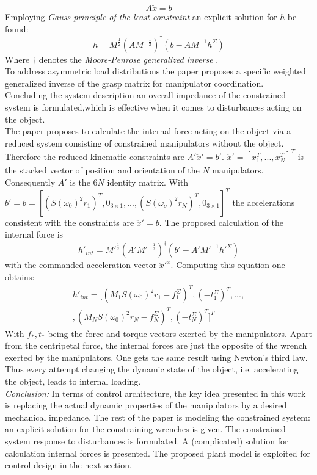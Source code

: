 \documentclass[conference]{IEEEtran}
\begin{document}
\begin{equation}
A \ddot{x} = b
\end{equation}
Employing \textit{Gauss principle of the least constraint} an explicit solution for $ h $ be found: 
\begin{equation}
h = M^{\frac{1}{2}}(AM^{-\frac{1}{2}})^{\dagger}(b - AM^{-1}h^\Sigma)
\end{equation}
Where $ \dagger $ denotes the \textit{Moore-Penrose generalized inverse} \cite{UdwadiaKalaba1992}.\\
To address asymmetric load distributions the paper proposes a specific weighted generalized inverse of the grasp matrix for manipulator coordination.\\
Concluding the system description an overall impedance of the constrained system is formulated,which is effective when it comes to disturbances acting on the object. \\
The paper proposes to calculate the internal force acting on the object via a reduced system consisting of constrained manipulators without the object. Therefore the reduced kinematic constraints are $ A'\ddot{x}' = b' $. $ \ddot{x}' = [x_1^T,...,x_N^T]^T $ is the stacked vector of position and orientation of the $ N $ manipulators. Consequently $ A' $ is the $ 6N $ identity matrix. With $ b' = b = [(S(\omega_0)^2r_1)^T,0_{3\times1},...,(S(\omega_o)^2r_N)^T,0_{3\times1} ]^T $ the accelerations consistent with the constraints are $ \ddot{x}' = b $. The proposed calculation of the internal force is
\begin{equation}
h'_{int} = M'^{\frac{1}{2}}(A'M'^{-\frac{1}{2}})^{\dagger}(b' - A'M'^{-1}h'^{\Sigma})
\end{equation}
with the commanded acceleration vector $ \ddot{x}'^x $. Computing this equation one obtains:
\begin{multline}
h'_{int} = [(M_1S(\omega_0)^2r_1 - f_1^\Sigma)^T,(-t_1^\Sigma)^T,...,\\,(M_NS(\omega_0)^2r_N - f_N^\Sigma)^T,(-t_N^\Sigma)^T]^T
\end{multline}
With $ f_*,t_* $ being the force and torque vectors exerted by the manipulators.
Apart from the centripetal force, the internal forces are just the opposite of the wrench exerted by the manipulators. One gets the same result using Newton's third law.
Thus every attempt changing the dynamic state of the object, i.e. accelerating the object, leads to internal loading. \\
\textit{Conclusion:} In terms of control architecture, the key idea presented in this work is replacing the actual dynamic properties of the manipulators by a desired mechanical impedance. The rest of the paper is modeling the constrained system: an explicit solution for the constraining wrenches is given. The constrained system response to disturbances is formulated. A (complicated) solution for calculation internal forces is presented. The proposed plant model is exploited for control design in the next section. 
\end{document}
